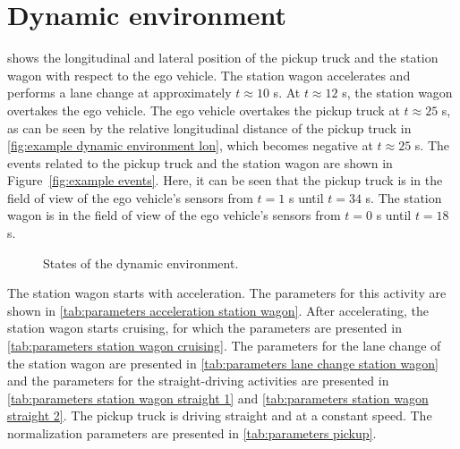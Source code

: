 \documentclass[10pt,final,a4paper,oneside,onecolumn]{article}
\newlength\figurewidth
\newlength\figureheight
\theoremstyle{plain}\newtheorem{definition}{Definition}[section]    %
\theoremstyle{definition}\newtheorem{example}{Example}[section]     %
\theoremstyle{remark}\newtheorem{remarkenv}{Remark}[section]        %
\begin{document}
\section{Dynamic environment}

 shows the longitudinal and lateral position of the pickup truck and the station wagon with respect to the ego vehicle. The station wagon accelerates and performs a lane change at approximately $t\approx10$ s. At $t\approx12$ s, the station wagon overtakes the ego vehicle. The ego vehicle overtakes the pickup truck at $t\approx25$ s, as can be seen by the relative longitudinal distance of the pickup truck in \cref{fig:example dynamic environment lon}, which becomes negative at $t\approx25$ s. The events related to the pickup truck and the station wagon are shown in Figure~\ref{fig:example events}. Here, it can be seen that the pickup truck is in the field of view of the ego vehicle's sensors from $t=1$ s until $t=34$ s. The station wagon is in the field of view of the ego vehicle's sensors from $t=0$ s until $t=18$ s.

\setlength\figureheight{150pt}
\setlength{}
\begin{figure}
	\centering
	\begin{minipage}[b]{0.499\linewidth}
		\centering
		\label{fig:example dynamic environment lon}
	\end{minipage}%
	\hfill
	\begin{minipage}[b]{0.49\linewidth}
		\centering
		\label{fig:example dynamic environment lat}
	\end{minipage}%
	\caption{States of the dynamic environment.}
	\label{fig:example dynamic environment}
\end{figure}

The station wagon starts with acceleration. The parameters for this activity are shown in \cref{tab:parameters acceleration station wagon}. After accelerating, the station wagon starts cruising, for which the parameters are presented in \cref{tab:parameters station wagon cruising}. The parameters for the lane change of the station wagon are presented in \cref{tab:parameters lane change station wagon} and the parameters for the straight-driving activities are presented in \cref{tab:parameters station wagon straight 1} and \cref{tab:parameters station wagon straight 2}. The pickup truck is driving straight and at a constant speed. The normalization parameters are presented in \cref{tab:parameters pickup}.
\end{document}
